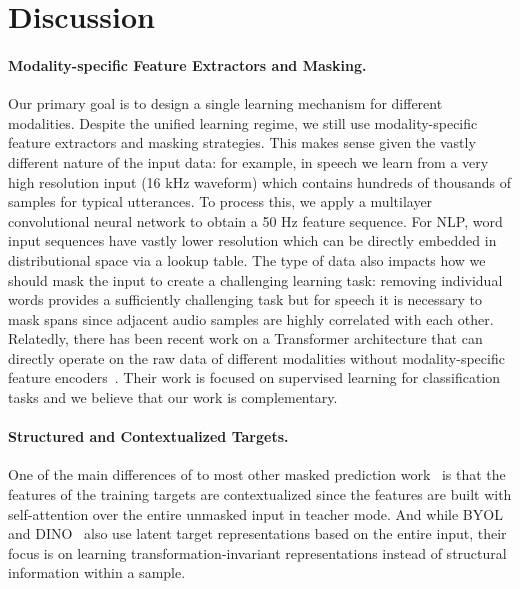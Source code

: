 \documentclass[nohyperref]{article}
\theoremstyle{plain}
\theoremstyle{definition}
\theoremstyle{remark}
\begin{document}
\section{Discussion}

\paragraph{Modality-specific Feature Extractors and Masking.}
Our primary goal is to design a single learning mechanism for different modalities. 
Despite the unified learning regime, we still use modality-specific feature extractors and masking strategies.
This makes sense given the vastly different nature of the input data:
for example, in speech we learn from a very high resolution input (16 kHz waveform) which contains hundreds of thousands of samples for typical utterances. 
To process this, we apply a multilayer convolutional neural network to obtain a 50 Hz feature sequence.
For NLP, word input sequences have vastly lower resolution which can be directly embedded in distributional space via a lookup table.
The type of data also impacts how we should mask the input to create a challenging learning task:
removing individual words provides a sufficiently challenging task but for speech it is necessary to mask spans since adjacent audio samples are highly correlated with each other.
Relatedly, there has been recent work on a Transformer architecture that can directly operate on the raw data of different modalities without modality-specific feature encoders~\citep{jaegle2021perceiver,jaegle2022perceiverio}.
Their work is focused on supervised learning for classification tasks and we believe that our work is complementary. 


\paragraph{Structured and Contextualized Targets.}
One of the main differences of \name{} to most other masked prediction work~\citep{devlin2018bert,baevski2020wav,ling2020decoar,bao2021beit,he2021mae,wei2021masked} is that the features of the training targets are contextualized since the features are built with self-attention over the entire unmasked input in teacher mode.
And while BYOL~\citep{grill2020byol} and DINO~\citep{caron2021dino} also use latent target representations based on the entire input, their focus is on learning transformation-invariant representations instead of structural information within a sample.
\end{document}
